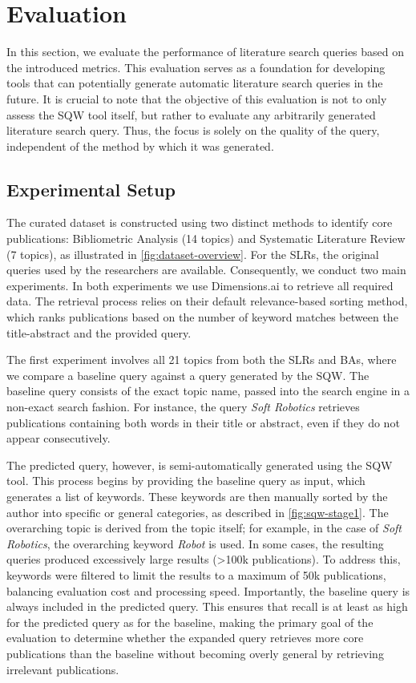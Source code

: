 {\let\clearpage\relax \chapter{Evaluation}\label{ch:eval}}
In this section, we evaluate the performance of literature search queries based on the introduced metrics. This evaluation serves as a foundation for developing tools that can potentially generate automatic literature search queries in the future. It is crucial to note that the objective of this evaluation is not to only assess the SQW tool itself, but rather to evaluate any arbitrarily generated literature search query. Thus, the focus is solely on the quality of the query, independent of the method by which it was generated.

\vspace*{.5cm}

\section{Experimental Setup}
The curated dataset is constructed using two distinct methods to identify core publications: Bibliometric Analysis (14 topics) and Systematic Literature Review (7 topics), as illustrated in \autoref{fig:dataset-overview}. For the SLRs, the original queries used by the researchers are available. Consequently, we conduct two main experiments. In both experiments we use Dimensions.ai to retrieve all required data. The retrieval process relies on their default relevance-based sorting method, which ranks publications based on the number of keyword matches between the title-abstract and the provided query.

The first experiment involves all 21 topics from both the SLRs and BAs, where we compare a baseline query against a query generated by the SQW. The baseline query consists of the exact topic name, passed into the search engine in a non-exact search fashion. For instance, the query \textit{Soft Robotics} retrieves publications containing both words in their title or abstract, even if they do not appear consecutively.

The predicted query, however, is semi-automatically generated using the SQW tool. This process begins by providing the baseline query as input, which generates a list of keywords. These keywords are then manually sorted by the author into specific or general categories, as described in \autoref{fig:sqw-stage1}. The overarching topic is derived from the topic itself; for example, in the case of \textit{Soft Robotics}, the overarching keyword \textit{Robot} is used. In some cases, the resulting queries produced excessively large results (>100k publications). To address this, keywords were filtered to limit the results to a maximum of 50k publications, balancing evaluation cost and processing speed. Importantly, the baseline query is always included in the predicted query. This ensures that recall is at least as high for the predicted query as for the baseline, making the primary goal of the evaluation to determine whether the expanded query retrieves more core publications than the baseline without becoming overly general by retrieving irrelevant publications.

